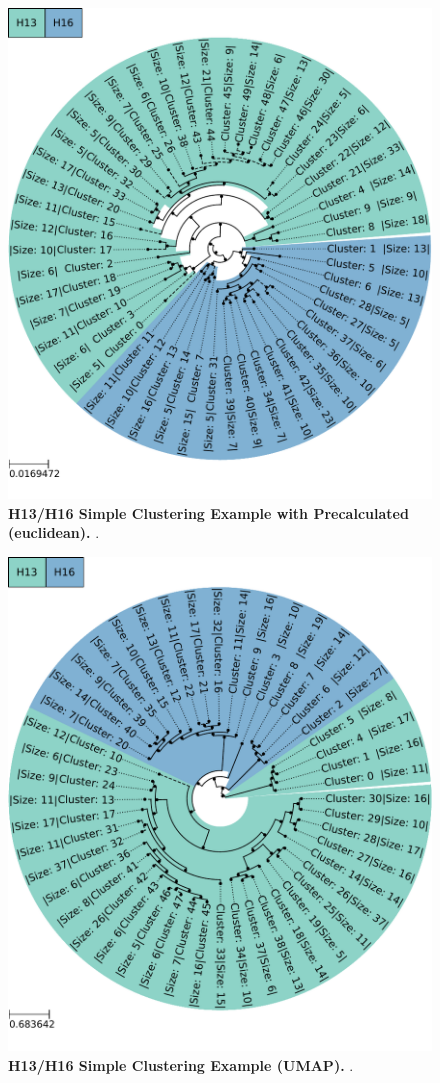 \begin{figure}[!hbt]
    \centering
    \includegraphics[width=\textwidth]{PCA/Clustertree_Segment_4_H_Euclidean.pdf}
    \caption[H13/H16 Simple Clustering Example with Precalculated (euclidean)]{\textbf{H13/H16 Simple Clustering Example with Precalculated (euclidean).} .}
    \label{fig:Simple_Clustertree_Euclid}
\end{figure}

\begin{figure}[!hbt]
    \centering
    \includegraphics[width=\textwidth]{UMAP/Clustertree_Segment_4_H_Simple.pdf}
    \caption[H13/H16 Simple Clustering Example (\Acrshort{UMAP})]{\textbf{H13/H16 Simple Clustering Example (\Acrshort{UMAP}).} .}
    \label{fig:Simple_Clustertree_UMAP}
\end{figure}